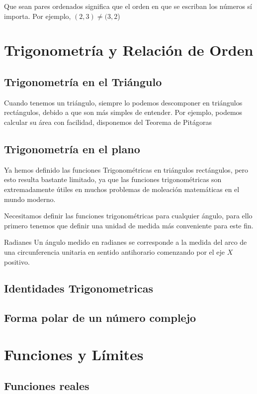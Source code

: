 \documentclass[11pt, twoside]{book}
\begin{document}
\begin{note}
    Que sean pares ordenados significa que el orden en que se escriban los números sí importa. Por ejemplo,
    \((2,3)\neq (3,2\))
\end{note}


\chapter{Trigonometría y Relación de Orden}
\section{Trigonometría en el Triángulo}
Cuando tenemos un triángulo, siempre lo podemos descomponer en triángulos rectángulos, debido a que son más simples de entender.
Por ejemplo, podemos calcular su área con facilidad, disponemos del Teorema de Pitágoras

\section{Trigonometría en el plano}
Ya hemos definido las funciones Trigonométricas en triángulos rectángulos, pero esto resulta bastante limitado, ya que las funciones trigonométricas son extremadamente útiles en muchos problemas de moleación matemáticas en el mundo moderno.


Necesitamos definir las funciones trigonométricas para cualquier ángulo, para ello primero tenemos que definir una unidad de medida más conveniente para este fin.
\begin{definition}{Radianes}
    Un ángulo medido en radianes se corresponde a la medida del arco de una circunferencia unitaria en sentido antihorario comenzando por el eje \(X\) positivo.
\end{definition}
\section{Identidades Trigonometricas}

\section{Forma polar de un número complejo}



\chapter{Funciones y Límites}
\section{Funciones reales}
\end{document}
